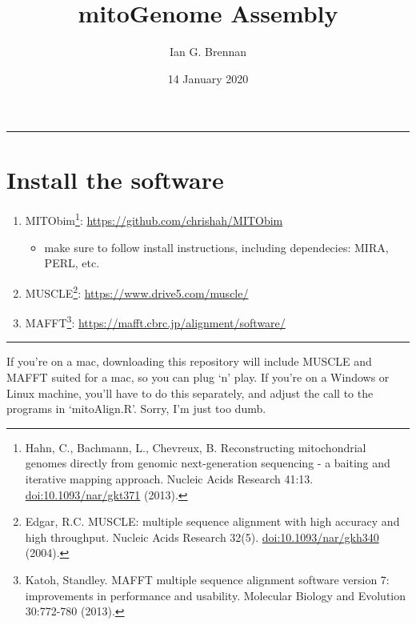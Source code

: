 \documentclass[
]{article}
\title{mitoGenome Assembly}
\author{Ian G. Brennan}
\date{14 January 2020}
\providecommand{\tightlist}{%
  \setlength{\itemsep}{0pt}\setlength{\parskip}{0pt}}
\begin{document}
\maketitle

{
\setcounter{tocdepth}{2}
\tableofcontents
}
\begin{center}\rule{0.5\linewidth}{0.5pt}\end{center}

\pagebreak

\hypertarget{install-the-software}{%
\section{Install the software}\label{install-the-software}}

\begin{enumerate}
\def\labelenumi{\arabic{enumi}.}
\tightlist
\item
  MITObim\footnote{Hahn, C., Bachmann, L., Chevreux, B. Reconstructing
    mitochondrial genomes directly from genomic next-generation
    sequencing - a baiting and iterative mapping approach. Nucleic Acids
    Research 41:13. \url{doi:10.1093/nar/gkt371} (2013).}:
  \url{https://github.com/chrishah/MITObim}

  \begin{itemize}
  \tightlist
  \item
    make sure to follow install instructions, including dependecies:
    MIRA, PERL, etc.
  \end{itemize}
\item
  MUSCLE\footnote{Edgar, R.C. MUSCLE: multiple sequence alignment with
    high accuracy and high throughput. Nucleic Acids Research 32(5).
    \url{doi:10.1093/nar/gkh340} (2004).}:
  \url{https://www.drive5.com/muscle/}
\item
  MAFFT\footnote{Katoh, Standley. MAFFT multiple sequence alignment
    software version 7: improvements in performance and usability.
    Molecular Biology and Evolution 30:772-780 (2013).}:
  \url{https://mafft.cbrc.jp/alignment/software/}
\end{enumerate}

\begin{center}\rule{0.5\linewidth}{0.5pt}\end{center}

If you're on a mac, downloading this repository will include MUSCLE and
MAFFT suited for a mac, so you can plug `n' play. If you're on a Windows
or Linux machine, you'll have to do this separately, and adjust the call
to the programs in `mitoAlign.R'. Sorry, I'm just too dumb.
\end{document}
